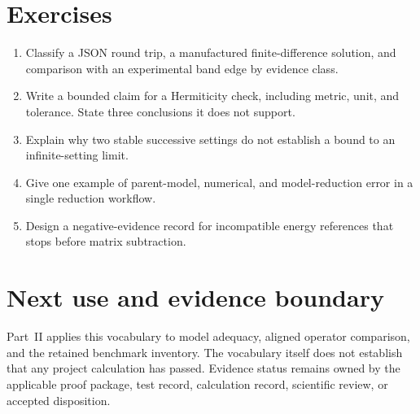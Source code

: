 \section{Exercises}

\begin{enumerate}
  \item Classify a JSON round trip, a manufactured finite-difference solution,
        and comparison with an experimental band edge by evidence class.
  \item Write a bounded claim for a Hermiticity check, including metric, unit,
        and tolerance. State three conclusions it does not support.
  \item Explain why two stable successive settings do not establish a bound to
        an infinite-setting limit.
  \item Give one example of parent-model, numerical, and model-reduction error
        in a single reduction workflow.
  \item Design a negative-evidence record for incompatible energy references
        that stops before matrix subtraction.
\end{enumerate}

\section{Next use and evidence boundary}

Part~II applies this vocabulary to model adequacy, aligned operator comparison,
and the retained benchmark inventory. The vocabulary itself does not establish
that any project calculation has passed. Evidence status remains owned by the
applicable proof package, test record, calculation record, scientific review,
or accepted disposition.
